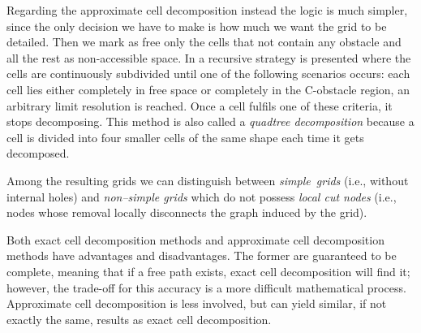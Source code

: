 

Regarding the approximate cell decomposition instead the logic is much simpler, since the only decision we have to make is how much we want the grid to be detailed. Then we mark as free only the cells that not contain any obstacle and all the rest as non-accessible space. In \cite{stanf:cellDec} a recursive strategy is presented where the cells are continuously subdivided until one of the following scenarios occurs: each cell lies either completely in free space or completely in the C-obstacle region, an arbitrary limit resolution is reached.
Once a cell fulfils one of these criteria, it stops decomposing. This method is also called a \emph{quadtree decomposition} because a cell is divided into four smaller cells of the same shape each time it gets decomposed.

Among the resulting grids we can distinguish between \mbox{\textit{simple grids}} (i.e., without internal holes) and \textit{non--simple grids} which do not possess \textit{local cut nodes} (i.e., nodes whose removal locally disconnects the graph induced by the grid). 


Both exact cell decomposition methods and approximate cell decomposition methods have advantages and disadvantages. The former are guaranteed to be complete, meaning that if a free path exists, exact cell decomposition will find it; however, the trade-off for this accuracy is a more difficult mathematical process. Approximate cell decomposition is less involved, but can yield similar, if not exactly the same, results as exact cell decomposition.


